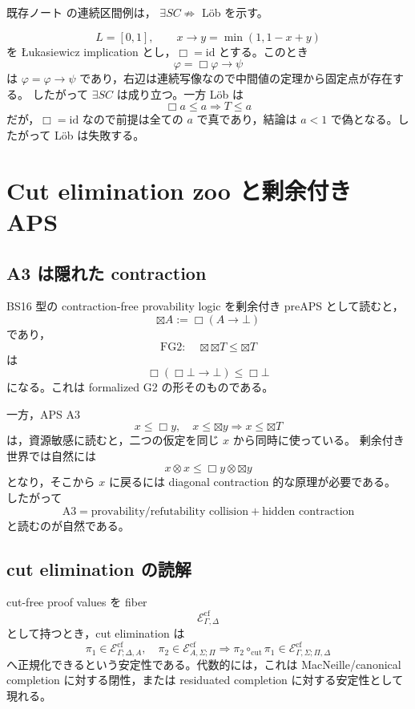 ﻿\documentclass[a4paper,10pt]{ltjsarticle}
\newcommand{\FGtwo}{\mathrm{FG2}}
\newcommand{\Boxop}{\Box}
\newcommand{\Btx}{\boxtimes}
\newcommand{\cut}{\mathrm{cut}}
\newcommand{\cf}{\mathrm{cf}}
\newcommand{\id}{\mathrm{id}}
\newcommand{\Top}{T}
\newcommand{\Bot}{\bot}
\begin{document}
既存ノート  の連続区間例は，
\(\exists SC\not\Rightarrow\) Löb を示す。

\[
L=[0,1],\qquad
x\to y=\min(1,1-x+y)
\]
を Łukasiewicz implication とし，\(\Boxop=\id\) とする。このとき
\[
\varphi=\Boxop\varphi\to\psi
\]
は \(\varphi=\varphi\to\psi\) であり，右辺は連続写像なので中間値の定理から固定点が存在する。
したがって \(\exists SC\) は成り立つ。一方 Löb は
\[
\Boxop a\le a\Rightarrow \Top\le a
\]
だが，\(\Boxop=\id\) なので前提は全ての \(a\) で真であり，結論は
\(a<1\) で偽となる。したがって Löb は失敗する。

\section{Cut elimination zoo と剰余付き APS}

\subsection{A3 は隠れた contraction}

BS16 型の contraction-free provability logic を剰余付き preAPS として読むと，
\[
\Btx A:=\Boxop(A\to\Bot)
\]
であり，
\[
\FGtwo:\quad \Btx\Btx\Top\le\Btx\Top
\]
は
\[
\Boxop(\Boxop\Bot\to\Bot)\le \Boxop\Bot
\]
になる。これは formalized G2 の形そのものである。

一方，APS A3
\[
x\le\Boxop y,\quad x\le\Btx y\Rightarrow x\le\Btx\Top
\]
は，資源敏感に読むと，二つの仮定を同じ \(x\) から同時に使っている。
剰余付き世界では自然には
\[
x\otimes x\le\Boxop y\otimes\Btx y
\]
となり，そこから \(x\) に戻るには diagonal contraction 的な原理が必要である。
したがって
\[
\text{A3}
=
\text{provability/refutability collision}
+\text{hidden contraction}
\]
と読むのが自然である。

\subsection{cut elimination の読解}

cut-free proof values を fiber
\[
\mathcal E^{\cf}_{\Gamma,\Delta}
\]
として持つとき，cut elimination は
\[
\pi_1\in\mathcal E^{\cf}_{\Gamma;\Delta,A},\quad
\pi_2\in\mathcal E^{\cf}_{A,\Sigma;\Pi}
\Rightarrow
\pi_2\circ_{\cut}\pi_1\in
\mathcal E^{\cf}_{\Gamma,\Sigma;\Pi,\Delta}
\]
へ正規化できるという安定性である。代数的には，これは MacNeille/canonical completion
に対する閉性，または residuated completion に対する安定性として現れる。
\end{document}
